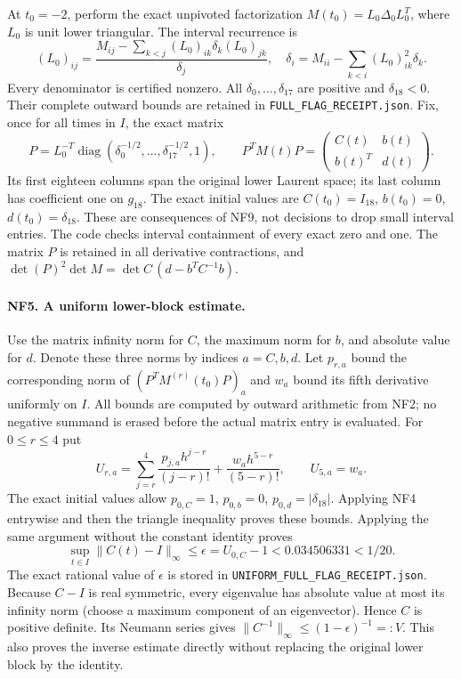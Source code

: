 \documentclass[11pt,a4paper]{article}
\theoremstyle{definition}\newtheorem{definition}[theorem]{Definition}
\begin{document}
At $t_0=-2$, perform the exact unpivoted factorization
$M(t_0)=L_0\Delta_0L_0^T$, where $L_0$ is unit lower triangular.
The interval recurrence is
\[
 (L_0)_{ij}=\frac{M_{ij}-\sum_{k<j}(L_0)_{ik}\delta_k(L_0)_{jk}}{\delta_j},
 \quad
 \delta_i=M_{ii}-\sum_{k<i}(L_0)_{ik}^2\delta_k.
 \tag{NF9}
\]
Every denominator is certified nonzero. All $\delta_0,\ldots,
\delta_{17}$ are positive and $\delta_{18}<0$. Their complete
outward bounds are retained in \texttt{FULL\_FLAG\_RECEIPT.json}.
Fix, once for all times in $I$, the exact matrix
\[
 P=L_0^{-T}\operatorname{diag}
 (\delta_0^{-1/2},\ldots,\delta_{17}^{-1/2},1),\qquad
 P^TM(t)P=\begin{pmatrix}C(t)&b(t)\\b(t)^T&d(t)\end{pmatrix}.
 \tag{NF10}
\]
Its first eighteen columns span the original lower Laurent space;
its last column has coefficient one on $g_{18}$. The exact initial
values are $C(t_0)=I_{18}$, $b(t_0)=0$, $d(t_0)=\delta_{18}$.
These are consequences of NF9, not decisions to drop small
interval entries. The code checks interval containment of every
exact zero and one. The matrix $P$ is retained in all derivative
contractions, and $\det(P)^2\det M=\det C\,(d-b^TC^{-1}b)$.

\paragraph{NF5. A uniform lower-block estimate.}
Use the matrix infinity norm for $C$, the maximum norm for $b$,
and absolute value for $d$. Denote these three norms by indices
$a=C,b,d$. Let $p_{r,a}$ bound the corresponding norm of
$(P^TM^{(r)}(t_0)P)_a$ and $w_a$ bound its fifth derivative
uniformly on $I$. All bounds are computed by outward arithmetic
from NF2; no negative summand is erased before the actual matrix
entry is evaluated. For $0\le r\le4$ put
\[
 U_{r,a}=\sum_{j=r}^4\frac{p_{j,a}h^{j-r}}{(j-r)!}
             +\frac{w_a h^{5-r}}{(5-r)!},\qquad U_{5,a}=w_a.
 \tag{NF11}
\]
The exact initial values allow $p_{0,C}=1$, $p_{0,b}=0$,
$p_{0,d}=|\delta_{18}|$. Applying NF4 entrywise and then the
triangle inequality proves these bounds. Applying the same
argument without the constant identity proves
\[
 \sup_{t\in I}\|C(t)-I\|_\infty
 \le\epsilon=U_{0,C}-1
 <0.034506331<1/20.
 \tag{NF12}
\]
The exact rational value of $\epsilon$ is stored in
\texttt{UNIFORM\_FULL\_FLAG\_RECEIPT.json}.
Because $C-I$ is real symmetric, every eigenvalue has absolute
value at most its infinity norm (choose a maximum component of
an eigenvector). Hence $C$ is positive definite. Its Neumann
series gives $\|C^{-1}\|_\infty\le(1-\epsilon)^{-1}=:V$.
This also proves the inverse estimate directly without replacing
the original lower block by the identity.
\end{document}
